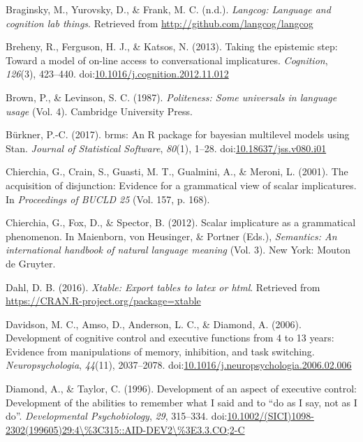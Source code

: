 \documentclass[mask,man]{apa6}
\begin{document}
\hypertarget{ref-R-langcog}{}
Braginsky, M., Yurovsky, D., \& Frank, M. C. (n.d.). \emph{Langcog:
Language and cognition lab things}. Retrieved from
\url{http://github.com/langcog/langcog}

\hypertarget{ref-breheny2013}{}
Breheny, R., Ferguson, H. J., \& Katsos, N. (2013). Taking the epistemic
step: Toward a model of on-line access to conversational implicatures.
\emph{Cognition}, \emph{126}(3), 423--440.
doi:\href{https://doi.org/10.1016/j.cognition.2012.11.012}{10.1016/j.cognition.2012.11.012}

\hypertarget{ref-brown1987}{}
Brown, P., \& Levinson, S. C. (1987). \emph{Politeness: Some universals
in language usage} (Vol. 4). Cambridge University Press.

\hypertarget{ref-R-brms}{}
Bürkner, P.-C. (2017). brms: An R package for bayesian multilevel models
using Stan. \emph{Journal of Statistical Software}, \emph{80}(1), 1--28.
doi:\href{https://doi.org/10.18637/jss.v080.i01}{10.18637/jss.v080.i01}

\hypertarget{ref-chierchia2001}{}
Chierchia, G., Crain, S., Guasti, M. T., Gualmini, A., \& Meroni, L.
(2001). The acquisition of disjunction: Evidence for a grammatical view
of scalar implicatures. In \emph{Proceedings of BUCLD 25} (Vol. 157, p.
168).

\hypertarget{ref-chierchia2012}{}
Chierchia, G., Fox, D., \& Spector, B. (2012). Scalar implicature as a
grammatical phenomenon. In Maienborn, von Heusinger, \& Portner (Eds.),
\emph{Semantics: An international handbook of natural language meaning}
(Vol. 3). New York: Mouton de Gruyter.

\hypertarget{ref-R-xtable}{}
Dahl, D. B. (2016). \emph{Xtable: Export tables to latex or html}.
Retrieved from \url{https://CRAN.R-project.org/package=xtable}

\hypertarget{ref-davidson2006}{}
Davidson, M. C., Amso, D., Anderson, L. C., \& Diamond, A. (2006).
Development of cognitive control and executive functions from 4 to 13
years: Evidence from manipulations of memory, inhibition, and task
switching. \emph{Neuropsychologia}, \emph{44}(11), 2037--2078.
doi:\href{https://doi.org/10.1016/j.neuropsychologia.2006.02.006}{10.1016/j.neuropsychologia.2006.02.006}

\hypertarget{ref-diamond1996}{}
Diamond, A., \& Taylor, C. (1996). Development of an aspect of executive
control: Development of the abilities to remember what I said and to
``do as I say, not as I do''. \emph{Developmental Psychobiology},
\emph{29}, 315--334.
doi:\href{https://doi.org/10.1002/(SICI)1098-2302(199605)29:4/\%3C315::AID-DEV2/\%3E3.3.CO;2-C}{10.1002/(SICI)1098-2302(199605)29:4\textbackslash{}\%3C315::AID-DEV2\textbackslash{}\%3E3.3.CO;2-C}
\end{document}
